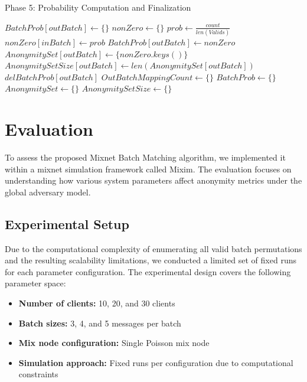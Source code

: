\documentclass{article}
\begin{document}
\begin{algorithm}[H]
\caption*{Phase 5: Probability Computation and Finalization}
\begin{algorithmic}[1]
        \State $ BatchProb[outBatch] \gets \{ \} $
    \EndIf
    \State $ nonZero \gets \{ \} $
        \State $ prob \gets \frac{count}{len(Valids)}$
            \State $ nonZero[inBatch] \gets prob $
        \EndIf
    \EndFor
        \State $ BatchProb[outBatch] \gets nonZero $
        \State $ AnonymitySet[outBatch] \gets \{ nonZero.keys() \} $
        \State $ AnonymitySetSize[outBatch] \gets len(AnonymitySet[outBatch]) $
    \Else
            \State $ del BatchProb[outBatch] $
        \EndIf
    \EndIf
\EndFor
\State $OutBatchMappingCount \gets \{ \} $
\State $ BatchProb \gets \{ \} $
\State $ AnonymitySet \gets \{ \} $
\State $ AnonymitySetSize \gets \{ \} $
\end{algorithmic}
\end{algorithm}

\section{Evaluation}
\label{sec:evaluation}

To assess the proposed Mixnet Batch Matching 
algorithm, we implemented it within a mixnet simulation framework 
called Mixim. The evaluation focuses on understanding how various 
system parameters affect anonymity metrics under the global 
adversary model.

\subsection{Experimental Setup}

Due to the computational complexity of enumerating all valid batch 
permutations and the resulting scalability limitations, we 
conducted a limited set of fixed runs for each parameter 
configuration. The experimental design covers the following 
parameter space:

\begin{itemize}
\item \textbf{Number of clients:} 10, 20, and 30 clients
\item \textbf{Batch sizes:} 3, 4, and 5 messages per batch
\item \textbf{Mix node configuration:} Single Poisson mix node
\item \textbf{Simulation approach:} Fixed runs per configuration 
due to computational constraints
\end{itemize}
\end{document}
